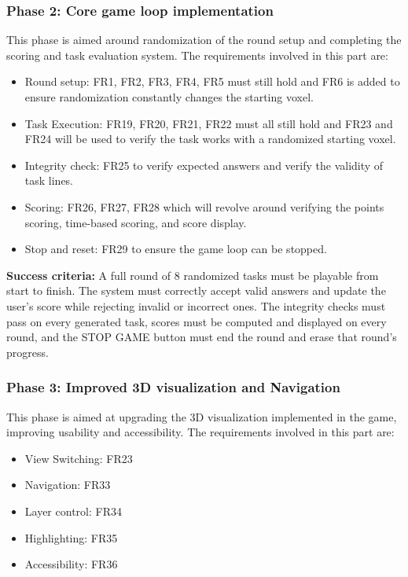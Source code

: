 \documentclass[12pt]{article}
\begin{document}
\subsubsection{Phase 2: Core game loop implementation}

This phase is aimed around randomization of the round setup and completing the scoring and task evaluation system.
The requirements involved in this part are: 
\begin{itemize}
\item Round setup: FR1, FR2, FR3, FR4, FR5 must still hold and FR6 is added to ensure randomization constantly changes the starting voxel.
\item Task Execution: FR19, FR20, FR21, FR22 must all still hold and FR23 and FR24 will be used to verify the task works with a randomized starting voxel.
\item Integrity check: FR25 to verify expected answers and verify the validity of task lines.
\item Scoring: FR26, FR27, FR28 which will revolve around verifying the points scoring, time-based scoring, and score display.
\item Stop and reset: FR29 to ensure the game loop can be stopped.
\end{itemize}
 
\textbf{Success criteria:} A full round of 8 randomized tasks must be playable from start to finish.
The system must correctly accept valid answers and update the user's score while rejecting invalid or incorrect ones. The
integrity checks must pass on every generated task, scores must be computed and displayed on every round, and the STOP GAME button must end the round and erase that round's progress.

\subsubsection{Phase 3: Improved 3D visualization and Navigation}

This phase is aimed at upgrading the 3D visualization implemented in the game, improving usability and accessibility.
The requirements involved in this part are: 
\begin{itemize}
\item View Switching: FR23
\item Navigation: FR33
\item Layer control: FR34
\item Highlighting: FR35
\item Accessibility: FR36
\end{itemize}
\end{document}
